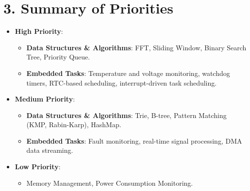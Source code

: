 \documentclass{article}
\begin{document}
\section*{3. Summary of Priorities}
\begin{itemize}
    \item \textbf{High Priority}:
    \begin{itemize}
        \item \textbf{Data Structures \& Algorithms}: FFT, Sliding Window, Binary Search Tree, Priority Queue.
        \item \textbf{Embedded Tasks}: Temperature and voltage monitoring, watchdog timers, RTC-based scheduling, interrupt-driven task scheduling.
    \end{itemize}
    
    \item \textbf{Medium Priority}:
    \begin{itemize}
        \item \textbf{Data Structures \& Algorithms}: Trie, B-tree, Pattern Matching (KMP, Rabin-Karp), HashMap.
        \item \textbf{Embedded Tasks}: Fault monitoring, real-time signal processing, DMA data streaming.
    \end{itemize}
    
    \item \textbf{Low Priority}:
    \begin{itemize}
        \item Memory Management, Power Consumption Monitoring.
    \end{itemize}
\end{itemize}
\end{document}
